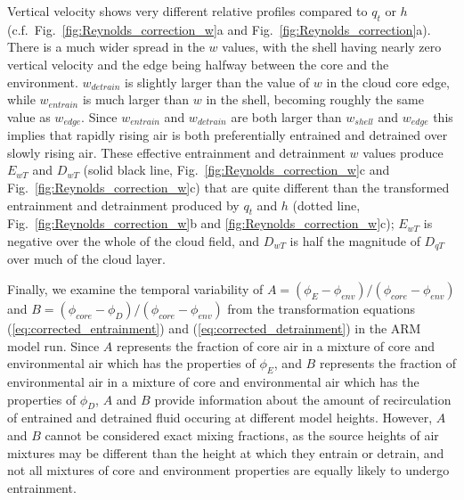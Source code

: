 \documentclass[12pt]{article}
\begin{document}
Vertical velocity shows very different relative profiles compared to
$q_t$ or $h$ (c.f.~Fig.~\ref{fig:Reynolds_correction_w}a and 
Fig.~\ref{fig:Reynolds_correction}a).  There is a
much wider spread in the $w$ values, with the shell having nearly zero
vertical velocity and the edge being halfway between the core and the
environment.  $w_{detrain}$ is slightly larger than the value of $w$
in the cloud core edge, while $w_{entrain}$ is much larger than $w$ in
the shell, becoming roughly the same value as $w_{edge}$.  Since
$w_{entrain}$ and $w_{detrain}$ are both larger than $w_{shell}$ and
$w_{edge}$ this implies that rapidly rising air is both preferentially
entrained and detrained over slowly rising air.  These effective
entrainment and detrainment $w$ values produce $E_{wT}$ and $D_{wT}$
(solid black line, Fig.~\ref{fig:Reynolds_correction_w}c and 
Fig.~\ref{fig:Reynolds_correction_w}c) that are quite different than the 
transformed entrainment and detrainment produced by $q_t$ and $h$
(dotted line, Fig.~\ref{fig:Reynolds_correction_w}b and 
\ref{fig:Reynolds_correction_w}c); $E_{wT}$ is negative
over the whole of the cloud field, and $D_{wT}$ is half the magnitude
of $D_{qT}$ over much of the cloud layer.

Finally, we examine the temporal variability of 
$A = (\phi_E - \phi_{env})/(\phi_{core} - \phi_{env})$ and
$B = (\phi_{core} - \phi_D)/(\phi_{core} - \phi_{env})$ from the transformation
equations (\ref{eq:corrected_entrainment}) and (\ref{eq:corrected_detrainment})
in the ARM model run.  Since $A$ represents the fraction of core air in a 
mixture of core and environmental air which has the properties of $\phi_E$, and
$B$ represents the fraction of environmental air in a mixture of core and 
environmental air which has the properties of $\phi_D$, $A$ and $B$ provide 
information about the amount of recirculation of entrained and detrained fluid 
occuring at different model heights.  However, $A$ and $B$ cannot be considered 
exact mixing fractions, as the source heights of air mixtures may be different 
than the height at which they entrain or detrain, and not all mixtures of 
core and environment properties are equally likely to undergo entrainment.
\end{document}
